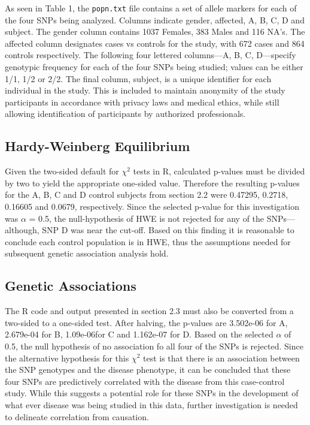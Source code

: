 \documentclass[11 pt,letterpaper]{article}
\begin{document}
    As seen in Table 1, the \texttt{popn.txt} file contains a set of allele markers for each of the four SNPs being analyzed.
    Columns indicate gender, affected, A, B, C, D and subject.
    The gender column contains 1037 Females, 383 Males and 116 NA's.
    The affected column designates cases vs controls for the study, with 672 cases and 864 controls respectively.
    The following four lettered columns---A, B, C, D---specify genotypic frequency for each of the four SNPs being studied; values can be either 1/1, 1/2 or 2/2.
    The final column, subject, is a unique identifier for each individual in the study.
    This is included to maintain anonymity of the study participants in accordance with privacy laws and medical ethics, while still allowing identification of participants by authorized professionals.

    \subsection{Hardy-Weinberg Equilibrium}

    Given the two-sided default for $\chi^2$ tests in R, calculated p-values must be divided by two to yield the appropriate one-sided value.
    Therefore the resulting p-values for the A, B, C and D control subjects from section 2.2 were 0.47295, 0.2718, 0.16605 and 0.0679, respectively.
    Since the selected p-value for this investigation was $\alpha$ = 0.5, the null-hypothesis of HWE is not rejected for any of the SNPs---although, SNP D was near the cut-off.
    Based on this finding it is reasonable to conclude each control population is in HWE, thus the assumptions needed for subsequent genetic association analysis hold.

    \subsection{Genetic Associations}

    The R code and output presented in section 2.3 must also be converted from a two-sided to a one-sided test.
    After halving, the p-values are 3.502e-06 for A, 2.679e-04 for B, 1.09e-06for C and 1.162e-07 for D.
    Based on the selected $\alpha$ of 0.5, the null hypothesis of no association fo all four of the SNPs is rejected.
    Since the alternative hypothesis for this $\chi^2$ test is that there is an association between the SNP genotypes and the disease phenotype, it can be concluded that these four SNPs are predictively correlated with the disease from this case-control study.
    While this suggests a potential role for these SNPs in the development of what ever disease was being studied in this data, further investigation is needed to delineate correlation from causation.
    
\end{document}
